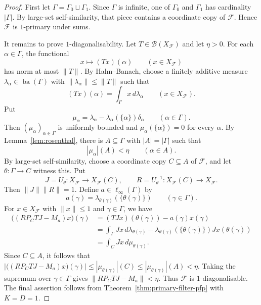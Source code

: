 \documentclass[11pt]{amsart}
\theoremstyle{plain}
\theoremstyle{definition}
\numberwithin{equation}{section}
\renewcommand{\leq}{\leqslant}
\begin{document}
\begin{proof}
First let \(\Gamma=\Gamma_0\sqcup\Gamma_1\).  Since \(\Gamma\) is infinite, one of \(\Gamma_0\) and \(\Gamma_1\) has cardinality \(|\Gamma|\).  By
large-set self-similarity, that piece contains a coordinate copy of \(\mathcal F\). Hence \(\mathcal F\) is \(1\)-primary under sums.

It remains to prove \(1\)-diagonalisability. Let
\(T\in\mathcal B(X_{\mathcal F})\) and let \(\eta>0\). For each
\(\alpha\in\Gamma\), the functional
\[
    x\mapsto (Tx)(\alpha)
    \qquad(x\in X_{\mathcal F})
\]
has norm at most \(\|T\|\).  By Hahn--Banach, choose a finitely additive measure \(\lambda_\alpha\in \operatorname{ba}(\Gamma)\) with \(\|\lambda_\alpha\|\leq \|T\|\) such that
\[
    (Tx)(\alpha)=\int_\Gamma x\,d\lambda_\alpha
    \qquad(x\in X_{\mathcal F}).
\]
Put
\[
    \mu_\alpha
    =\lambda_\alpha-
      \lambda_\alpha(\{\alpha\})\delta_\alpha
    \qquad(\alpha\in\Gamma).
\]
Then \((\mu_\alpha)_{\alpha\in\Gamma}\) is uniformly bounded and
\(\mu_\alpha(\{\alpha\})=0\) for every \(\alpha\).  By
Lemma~\ref{lem:rosenthal}, there is \(A\subseteq\Gamma\) with
\(|A|=|\Gamma|\) such that
\[
    |\mu_\alpha|(A)<\eta
    \qquad(\alpha\in A).
\]
By large-set self-similarity, choose a coordinate copy
\(C\subseteq A\) of \(\mathcal F\), and let \(\theta\colon\Gamma\to C\) witness this.  Put
\[
    J=U_\theta\colon X_{\mathcal F}\to X_{\mathcal F}(C),
    \qquad
    R=U_\theta^{-1}\colon X_{\mathcal F}(C)\to X_{\mathcal F}.
\]
Then \(\|J\|\|R\|=1\).  Define \(a\in\ell_\infty(\Gamma)\) by
\[
    a(\gamma)=\lambda_{\theta(\gamma)}(\{\theta(\gamma)\})
    \qquad(\gamma\in\Gamma).
\]
For \(x\in X_{\mathcal F}\) with \(\|x\|\leq 1\) and
\(\gamma\in\Gamma\), we have
\[
\begin{aligned}
    \bigl((R P_C T J-M_a)x\bigr)(\gamma)
    &= (T Jx)(\theta(\gamma))-a(\gamma)x(\gamma) \\
    &= \int_\Gamma Jx\,d\lambda_{\theta(\gamma)}
       -\lambda_{\theta(\gamma)}(\{\theta(\gamma)\})Jx(\theta(\gamma)) \\
    &= \int_C Jx\,d\mu_{\theta(\gamma)} .
\end{aligned}
\]
Since \(C\subseteq A\), it follows that
\(
    \left|\bigl((R P_C T J-M_a)x\bigr)(\gamma)\right|
    \leq |\mu_{\theta(\gamma)}|(C)
    \leq |\mu_{\theta(\gamma)}|(A)<\eta .
\)
Taking the supremum over \(\gamma\in\Gamma\) gives
\(
    \|R P_C T J-M_a\|<\eta .
\)
Thus \(\mathcal F\) is \(1\)-diagonalisable.  The final assertion follows from Theorem~\ref{thm:primary-filter-pfp} with \(K=D=1\).
\end{proof}
\end{document}
